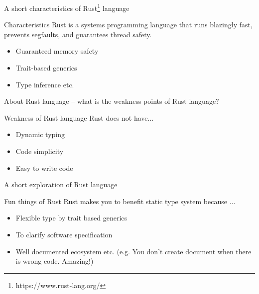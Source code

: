\documentclass[12pt, unicode]{beamer}
\begin{document}
\begin{frame}{A short characteristics of Rust\footnote[frame]{https://www.rust-lang.org/} language}
\begin{block}{Characteristics}
Rust is a systems programming language that runs blazingly fast, prevents segfaults, and guarantees thread safety.
\end{block}
\begin{itemize}
\item {} {Guaranteed memory safety}
\item {} {Trait-based generics}
\item {} {Type inference etc.}
\end{itemize}
\end{frame}

\begin{frame}{About Rust language -- what is the weakness points of Rust language?}
\begin{block}{Weakness of Rust language}
Rust does not have...
\end{block}
\begin{itemize}
\item {} {Dynamic typing}
\item {} {Code simplicity}
\item {} {Easy to write code}
\end{itemize}
\end{frame}

\newcommand\smallannotate{\fontsize{9}{9.2}\selectfont}
\begin{frame}{A short  exploration of Rust language}
\begin{block}{Fun things of Rust}
Rust makes you to benefit static type system because ...
\end{block}
\begin{itemize}
\item {} {Flexible type by trait based generics}
\item {} {To clarify software specification}
\item {} {Well documented ecosystem etc. {\smallannotate(e.g. You don't create document when there is wrong code. Amazing!)}}
\end{itemize}
\end{frame}
\end{document}
